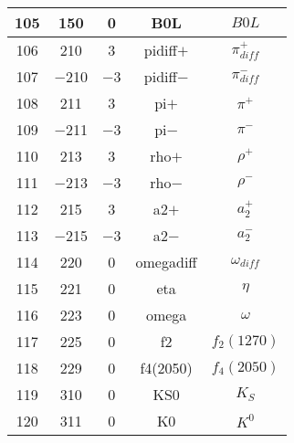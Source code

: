 \documentclass{article}
\begin{document}
\begin{table}[!htbp]
\begin{tabular}{|c|c|c|c|c|}
\hline
105 & 150 & 0 & B0L & $B0L$ \\
\hline
106 & 210 & 3 & pi\underline{\hspace{0.6em}}diff$+$ & $\pi_{diff}^{+}$ \\
\hline
107 & $-$210 & $-$3 & pi\underline{\hspace{0.6em}}diff$-$ & $\pi_{diff}^{-}$ \\
\hline
108 & 211 & 3 & pi$+$ & $\pi^{+}$ \\
\hline
109 & $-$211 & $-$3 & pi$-$ & $\pi^{-}$ \\
\hline
110 & 213 & 3 & rho$+$ & $\rho^{+}$ \\
\hline
111 & $-$213 & $-$3 & rho$-$ & $\rho^{-}$ \\
\hline
112 & 215 & 3 & a\underline{\hspace{0.6em}}2$+$ & $a_{2}^{+}$ \\
\hline
113 & $-$215 & $-$3 & a\underline{\hspace{0.6em}}2$-$ & $a_{2}^{-}$ \\
\hline
114 & 220 & 0 & omega\underline{\hspace{0.6em}}diff & $\omega_{diff}$ \\
\hline
115 & 221 & 0 & eta & $\eta$ \\
\hline
116 & 223 & 0 & omega & $\omega$ \\
\hline
117 & 225 & 0 & f\underline{\hspace{0.6em}}2 & $f_{2}(1270)$ \\
\hline
118 & 229 & 0 & f\underline{\hspace{0.6em}}4(2050) & $f_{4}(2050)$ \\
\hline
119 & 310 & 0 & K\underline{\hspace{0.6em}}S0 & $K_{S}$ \\
\hline
120 & 311 & 0 & K0 & $K^{0}$ \\
\hline
\end{tabular}
\end{table}

\clearpage
\end{document}

